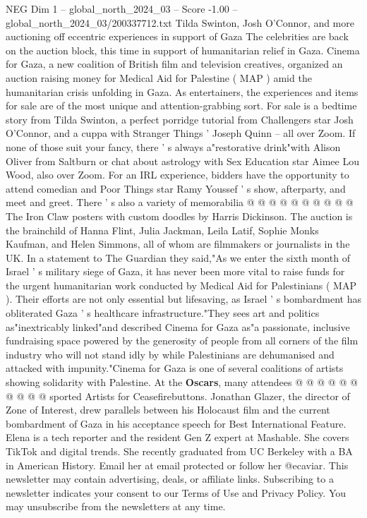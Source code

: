 \begin{textsample}{NEG Dim 1 – global\_north\_2024\_03 – Score -1.00 – global\_north\_2024\_03/200337712.txt}  \label{ex:f1_neg_067}
Tilda Swinton, Josh O'Connor, and more auctioning off eccentric experiences in support of Gaza The celebrities are back on the auction block, this time in support of humanitarian relief in Gaza.
Cinema for Gaza, a new coalition of British film and television creatives, organized an auction raising money for Medical Aid for Palestine ( MAP ) amid the humanitarian crisis unfolding in Gaza.
As entertainers, the experiences and items for sale are of the most unique and attention-grabbing sort.
For sale is a bedtime story from Tilda Swinton, a perfect porridge tutorial from Challengers star Josh O'Connor, and a cuppa with Stranger Things ' Joseph Quinn -- all over Zoom.
If none of those suit your fancy, there ' s always a"restorative drink"with Alison Oliver from Saltburn or chat about astrology with Sex Education star Aimee Lou Wood, also over Zoom.
For an IRL experience, bidders have the opportunity to attend comedian and Poor Things star Ramy Youssef ' s show, afterparty, and meet and greet.
There ' s also a variety of memorabilia @ @ @ @ @ @ @ @ @ @ The Iron Claw posters with custom doodles by Harris Dickinson.
The auction is the brainchild of Hanna Flint, Julia Jackman, Leila Latif, Sophie Monks Kaufman, and Helen Simmons, all of whom are filmmakers or journalists in the UK.
In a statement to The Guardian they said,"As we enter the sixth month of Israel ' s military siege of Gaza, it has never been more vital to raise funds for the urgent humanitarian work conducted by Medical Aid for Palestinians ( MAP ).
Their efforts are not only essential but lifesaving, as Israel ' s bombardment has obliterated Gaza ' s healthcare infrastructure."They sees art and politics as"inextricably linked"and described Cinema for Gaza as"a passionate, inclusive fundraising space powered by the generosity of people from all corners of the film industry who will not stand idly by while Palestinians are dehumanised and attacked with impunity."Cinema for Gaza is one of several coalitions of artists showing solidarity with Palestine.
At the \textbf{Oscars}, many attendees @ @ @ @ @ @ @ @ @ @ sported Artists for Ceasefirebuttons.
Jonathan Glazer, the director of Zone of Interest, drew parallels between his Holocaust film and the current bombardment of Gaza in his acceptance speech for Best International Feature.
Elena is a tech reporter and the resident Gen Z expert at Mashable.
She covers TikTok and digital trends.
She recently graduated from UC Berkeley with a BA in American History.
Email her at email protected or follow her @ecaviar.
This newsletter may contain advertising, deals, or affiliate links.
Subscribing to a newsletter indicates your consent to our Terms of Use and Privacy Policy.
You may unsubscribe from the newsletters at any time.

\end{textsample}
